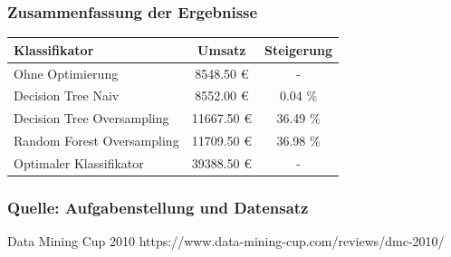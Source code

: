 \documentclass{beamer}
\begin{document}
\begin{frame}
\frametitle{Zusammenfassung der Ergebnisse}
\begin{table}
\begin{tabular}{l c c}
\toprule
\textbf{Klassifikator} & \textbf{Umsatz} & \textbf{Steigerung}\\
\midrule
Ohne Optimierung & 8548.50 \euro{} & - \\
Decision Tree Naiv & 8552.00 \euro{} & 0.04 \%\\
Decision Tree Oversampling  & 11667.50 \euro{} & 36.49 \% \\
Random Forest Oversampling  & 11709.50 \euro{} &  36.98 \% \\
Optimaler Klassifikator  & 39388.50 \euro{} &  -\\
\bottomrule
\end{tabular}
\end{table}
\end{frame}



\begin{frame}
\frametitle{Quelle: Aufgabenstellung und Datensatz}
\footnotesize{
\begin{thebibliography}{99} %
 Data Mining Cup 2010
\newblock https://www.data-mining-cup.com/reviews/dmc-2010/
\end{thebibliography}
}
\end{frame}




\end{document}
